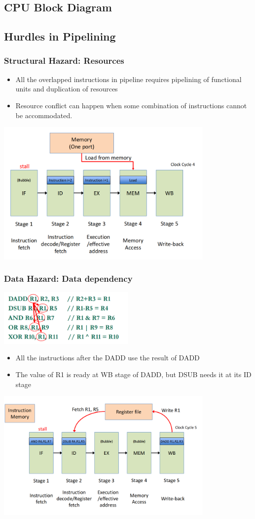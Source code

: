\documentclass[12pt]{article}
\begin{document}
\subsection{CPU Block Diagram}
\subsection{Hurdles in Pipelining}
\subsubsection{Structural Hazard: Resources}
\begin{itemize}
    \item All the overlapped instructions in pipeline requires pipelining of functional units and duplication of resources
    \item Resource conflict can happen when some combination of instructions cannot be accommodated.
\end{itemize}
\includegraphics[width=0.8\textwidth]{StucturalHazard1.png}
\subsubsection{Data Hazard: Data dependency}
\includegraphics[width=0.5\textwidth]{DataHazard.png}
\begin{itemize}
    \item All the instructions after the DADD use the result of DADD
    \item The value of R1 is ready at WB stage of DADD, but DSUB needs it at its ID stage
\end{itemize}
\includegraphics[width=0.8\textwidth]{StucturalHazard2.png}
\end{document}
